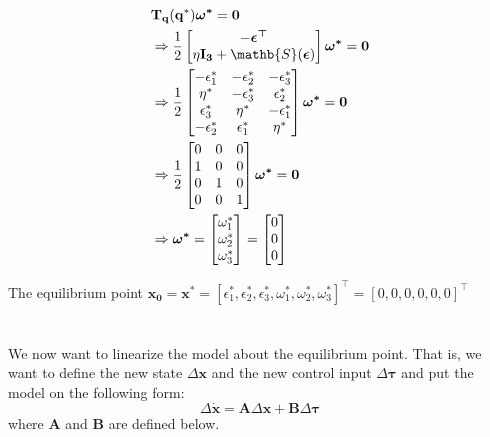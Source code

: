 \begin{equation*}
    \begin{split}
        &\mathbf{T_q(q^*)}\boldsymbol{\omega^*} = \mathbf{0} \\
        &\Rightarrow \frac{1}{2}
        \m{
            -\boldsymbol{\epsilon^\top}\\
            \eta \mathbf{I_{3}} + \mathb{S}(\boldsymbol{\epsilon})
        }
        \boldsymbol{\omega^*} = \mathbf{0}\\
        &\Rightarrow \frac{1}{2}
        \m{
            -\epsilon_1^*   &  -\epsilon_2^*   &   -\epsilon_3^*\\
            \eta^*   &   -\epsilon_3^*   &   \epsilon_2^*\\
            \epsilon_3^*   &   \eta^*   &   -\epsilon_1^*\\
            -\epsilon_2^*   &   \epsilon_1^*   &   \eta^*\\  
        }
        \boldsymbol{\omega^*} = \mathbf{0}\\
        &\Rightarrow \frac{1}{2}
        \m{
            0   &   0   &   0\\
            1   &   0   &   0\\
            0   &   1   &   0\\
            0   &   0   &   1\\  
        }
        \boldsymbol{\omega^*} = \mathbf{0}\\
        &\Rightarrow \boldsymbol{\omega^*} = \m{\omega_1^* \\ \omega_2^* \\ \omega_3^*} = \m{0 \\ 0 \\ 0 }
    \end{split}
\end{equation*}

The equilibrium point $\mathbf{x_0 = x^*} = [\epsilon_1^*,\epsilon_2^*,\epsilon_3^*,\omega_1^*,\omega_2^*,\omega_3^*]^\top = [0,0,0,0,0,0]^\top$ \\ \\ \\
We now want to linearize the model about the equilibrium point. That is, we want to define the new state $\Delta \mathbf {x}$ and the new control input $\Delta \boldsymbol{\tau}$ and put the model on the following form:
\begin{equation*}
    \Delta \mathbf{\dot x} = \mathbf{A} \Delta\mathbf{x} + \mathbf{B} \Delta \boldsymbol{ \tau}
\end{equation*}
where $\mathbf{A}$ and $\mathbf{B}$ are defined below.

